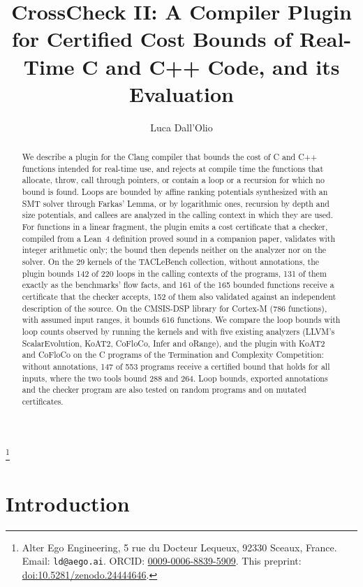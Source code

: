 \documentclass[oneside,english]{amsart}
\numberwithin{equation}{section}
\numberwithin{figure}{section}
\theoremstyle{plain}
\theoremstyle{definition}
\theoremstyle{plain}
\theoremstyle{remark}
\theoremstyle{plain}
\theoremstyle{definition}
\theoremstyle{plain}
\theoremstyle{remark}
\begin{document}
\title[CrossCheck II: Certified Cost Bounds for Real-Time C and C++]{CrossCheck II: A Compiler Plugin for Certified Cost Bounds of Real-Time C and C++ Code, and its Evaluation}
\author{Luca Dall'Olio}
\thanks{Alter Ego Engineering, 5 rue du Docteur Lequeux, 92330 Sceaux, France. Email: \texttt{ld@aego.ai}. ORCID: \href{https://orcid.org/0009-0006-8839-5909}{0009-0006-8839-5909}. This preprint: \href{https://doi.org/10.5281/zenodo.24444646}{doi:10.5281/zenodo.24444646}.}
\begin{abstract}
We describe a plugin for the Clang compiler that bounds the cost of C and C++ functions intended for real-time use, and rejects at compile time the functions that allocate, throw, call through pointers, or contain a loop or a recursion for which no bound is found. Loops are bounded by affine ranking potentials synthesized with an SMT solver through Farkas' Lemma, or by logarithmic ones, recursion by depth and size potentials, and callees are analyzed in the calling context in which they are used. For functions in a linear fragment, the plugin emits a cost certificate that a checker, compiled from a Lean~4 definition proved sound in a companion paper, validates with integer arithmetic only; the bound then depends neither on the analyzer nor on the solver. On the 29 kernels of the TACLeBench collection, without annotations, the plugin bounds 142 of 220 loops in the calling contexts of the programs, 131 of them exactly as the benchmarks' flow facts, and 161 of the 165 bounded functions receive a certificate that the checker accepts, 152 of them also validated against an independent description of the source. On the CMSIS-DSP library for Cortex-M (786 functions), with assumed input ranges, it bounds 616 functions. We compare the loop bounds with loop counts observed by running the kernels and with five existing analyzers (LLVM's ScalarEvolution, KoAT2, CoFloCo, Infer and oRange), and the plugin with KoAT2 and CoFloCo on the C programs of the Termination and Complexity Competition: without annotations, 147 of 553 programs receive a certified bound that holds for all inputs, where the two tools bound 288 and 264. Loop bounds, exported annotations and the checker program are also tested on random programs and on mutated certificates.
\end{abstract}

\maketitle

\section{Introduction}
\end{document}
